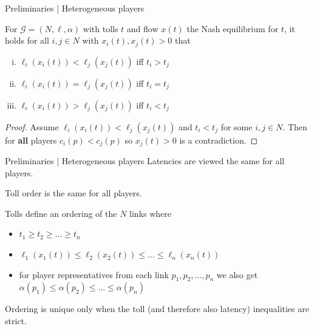 \documentclass{beamer}
\newcommand{\Gm}{\mathcal{G}}
\begin{document}
\begin{frame}{Preliminaries | Heterogeneous players}
	\begin{lemma}
		For $\Gm = (N, \ell, \alpha)$ with tolls $t$ and flow $x(t)$ the Nash equilibrium for $t$, it holds for all $i, j \in N$ with $x_i(t), x_j(t) > 0$ that
		\begin{enumerate}[(i)]
			\item $\ell_i(x_i(t)) < \ell_j(x_j(t))$ iff $t_i > t_j$
			\item $\ell_i(x_i(t)) = \ell_j(x_j(t))$ iff $t_i = t_j$
			\item $\ell_i(x_i(t)) > \ell_j(x_j(t))$ iff $t_i < t_j$
		\end{enumerate}
	\end{lemma}
	\begin{proof}
		Assume $\ell_i(x_i(t)) < \ell_j(x_j(t))$ and $t_i < t_j$ for some $i, j \in N$.
		Then for \textbf{all} players $c_i(p) < c_j(p)$ so $x_j(t) > 0$ is a contradiction.
	\end{proof}
\end{frame}

\begin{frame}{Preliminaries | Heterogeneous players}
	Latencies are viewed the same for all players.

	Toll order is the same for all players.

	Tolls define an ordering of the $N$ links where
	\begin{itemize}
		\item $t_1 \ge t_2 \ge \dots \ge t_n$
		\item $\ell_1(x_1(t)) \le \ell_2(x_2(t)) \le \dots \le \ell_n(x_n(t))$
		\item for player representatives from each link $p_1, p_2, \dots, p_n$ we also get $\alpha(p_1) \le \alpha(p_2) \le \dots \le \alpha(p_n)$
	\end{itemize}
	Ordering is unique only when the toll (and therefore also latency) inequalities are strict.
\end{frame}

\end{document}
